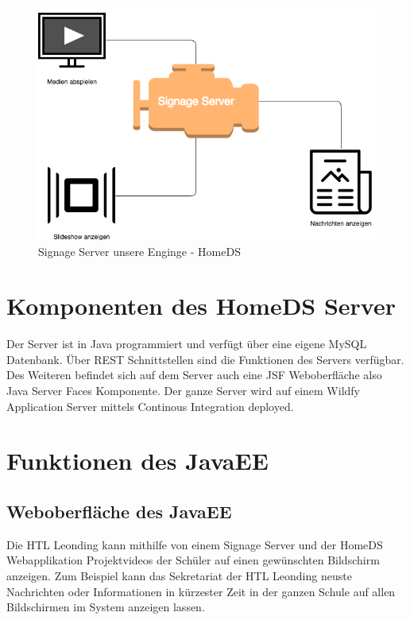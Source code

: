 \begin{figure}[H]
\centering
\includegraphics[width=1\textwidth]{images/08_HomeDsWeb/SignageEngine.png}
\caption{Signage Server unsere Enginge - HomeDS}
\label{img:xiboengine}
\end{figure}
 
\section{Komponenten des HomeDS Server}\label{sec:homedscomponents}
Der Server ist in Java programmiert und verfügt über eine eigene MySQL Datenbank. Über REST Schnittstellen sind die Funktionen des Servers verfügbar. Des Weiteren befindet sich auf dem Server auch eine JSF Weboberfläche also Java Server Faces Komponente. Der ganze Server wird auf einem Wildfy Application Server mittels Continous Integration deployed. 
 
\section{Funktionen des JavaEE}
\subsection{Weboberfläche des JavaEE}\label{sec:javaeejsfweb}
Die HTL Leonding kann mithilfe von einem Signage Server und der HomeDS Webapplikation Projektvideos der Schüler auf einen gewünschten Bildschirm anzeigen.  Zum Beispiel kann das Sekretariat der HTL Leonding neuste Nachrichten oder Informationen in kürzester Zeit in der ganzen Schule auf allen Bildschirmen im System anzeigen lassen.

